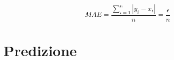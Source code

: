 \documentclass[%
    corpo=12pt,
    twoside,
    oldstyle,
    autoretitolo,
    greek,
    evenboxes,
]{toptesi}
\begin{document}
\begin{center}
  \begin{equation}
    MAE = \frac{\sum_{i=1}^{n}{|y_{i} - x_{i}|}}{n} = \frac{\epsilon}{n}
  \end{equation}
\end{center}



\chapter{Predizione}
\label{chap:forecasting}


\end{document}
